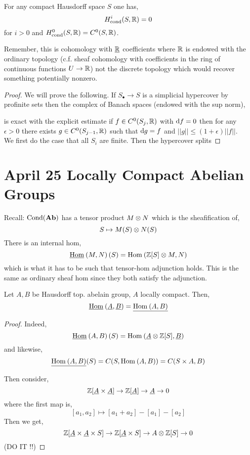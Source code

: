 \documentclass[12pt]{article}
\newcommand{\cond}{\text{cond}}
\newcommand{\Cond}{\mathrm{Cond}}
\begin{document}
\begin{theorem}
For any compact Hausdorff space $S$ one has,
\[ H^i_{\cond}(S, \RR) = 0 \]
for $i > 0$ and $H^0_{\cond}(S, \RR) = C^0(S, \RR)$.
\end{theorem}

\begin{rmk}
Remember, this is cohomology with $\underline{\mathbb{R}}$ coefficients where $\mathbb{R}$ is endowed with the ordinary topology (c.f. sheaf cohomology with coefficients in the ring of continuous functions $U \to \mathbb{R}$) not the discrete topology which would recover something potentially nonzero.
\end{rmk}

\begin{proof}
We will prove the following. If $S_\bullet \to S$ is a simplicial hypercover by profinite sets then the complex of Banach spaces (endowed with the sup norm),
\begin{center}
\end{center}
is exact with the explicit estimate if $f \in C^0(S_j, \mathbb{R})$ with $\mathrm{d}{f} = 0$ then for any $\epsilon > 0$ there exists $g \in C^0(S_{j-1}, \mathbb{R})$ such that $\mathrm{d}{g} = f$ and $||g|| \le (1 + \epsilon) || f ||$.
\bigskip\\
We first do the case that all $S_i$ are finite. Then the hypercover splits 
\end{proof}

\section{April 25 Locally Compact Abelian Groups}

Recall: $\Cond(\Ab)$ has a tensor product $M \otimes N$ which is the sheafification of,
\[ S \mapsto M(S) \otimes N(S) \]
There is an internal hom,
\[ \underline{\mathrm{Hom}}_{} \left( M, N \right)(S) = \mathrm{Hom}_{} \left( \mathbb{Z}[S] \otimes M, N \right) \]
which is what it has to be such that tensor-hom adjunction holds. This is the same as ordinary sheaf hom since they both satisfy the adjunction.

\begin{prop}
Let $A, B$ be Hausdorff top. abelain group, $A$ locally compact. Then,
\[ \underline{\mathrm{Hom}}_{} \left( \underline{A}, \underline{B} \right) = \underline{\mathrm{Hom}_{} \left( A, B \right)} \]
\end{prop}

\begin{proof}
Indeed, 
\[ \underline{\mathrm{Hom}}_{} \left( A, B \right)(S) = \mathrm{Hom}_{} \left( \underline{A} \otimes \mathbb{Z}[S], \underline{B} \right) \]
and likewise,
\[ \underline{\mathrm{Hom}_{} \left( A, B \right)}(S) = C(S, \mathrm{Hom}_{} \left( A, B \right)) = C(S \times A, B) \]

Then consider,
\[ \mathbb{Z}[\underline{A} \times \underline{A}] \to \mathbb{Z}[\underline{A}] \to \underline{A} \to 0 \]
where the first map is,
\[ [a_1, a_2] \mapsto [a_1 + a_2] - [a_1] - [a_2] \]
Then we get,
\[ \mathbb{Z}[\underline{A} \times \underline{A} \times S] \to \mathbb{Z}[\underline{A} \times S] \to A \otimes \mathbb{Z}[S] \to 0 \]
(DO IT !!)
\end{proof}
\end{document}

